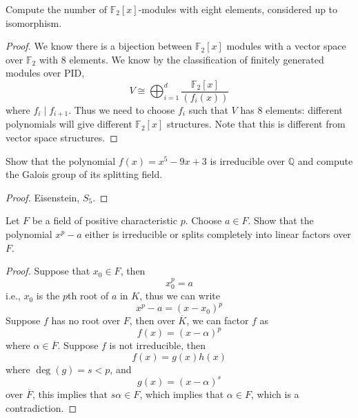 \documentclass[openany]{book}
\newcommand{\F}{\mathbb{F}}
\begin{document}
\begin{prob}
    Compute the number of $\mathbb F_2[x]$-modules with eight elements, considered up to isomorphism.
\end{prob}
\begin{proof}
    We know there is a bijection between $\F_2[x]$ modules with a vector space over $\F_2$ with $8$ elements. We know by the classification of finitely generated modules over PID, 
    \begin{equation*}
        V\cong\bigoplus_{i=1}^d\frac{\F_2[x]}{(f_i(x))}
    \end{equation*} 
    where $f_i\mid f_{i+1}$. Thus we need to choose $f_i$ such that $V$ has $8$ elements: different polynomials will give different $\F_2[x]$ structures. Note that this is different from vector space structures. 
\end{proof}

\begin{prob}
    Show that the polynomial $f(x)=x^5-9x+3$ is irreducible over $\mathbb Q$ and compute the Galois group of its splitting field.
\end{prob}
\begin{proof}
    Eisenstein, $S_5$.
\end{proof}

\begin{prob}
    Let $F$ be a field of positive characteristic $p$. Choose $a\in F$. Show that the polynomial $x^p-a$ either is irreducible or splits completely into linear factors over $F$.
\end{prob}
\begin{proof}
    Suppose that $x_0\in F$, then 
    \begin{equation*}
        x_0^p=a
    \end{equation*}
    i.e., $x_0$ is the $p$th root of $a$ in $K$, thus we can write 
    \begin{equation*}
        x^p-a=(x-x_0)^p
    \end{equation*}
    Suppose $f$ has no root over $F$, then over $\overline{K}$, we can factor $f$ as 
    \begin{equation*}
        f(x)=(x-\alpha)^p
    \end{equation*}
    where $\alpha\in\overline{F}$. Suppose $f$ is not irreducible, then 
    \begin{equation*}
        f(x)=g(x)h(x)
    \end{equation*}
    where $\deg(g)=s<p$, and 
    \begin{equation*}
        g(x)=(x-\alpha)^s
    \end{equation*}
    over $\overline{F}$, this implies that $s\alpha\in F$, which implies that $\alpha\in F$, which is a contradiction.
\end{proof}
\end{document}
